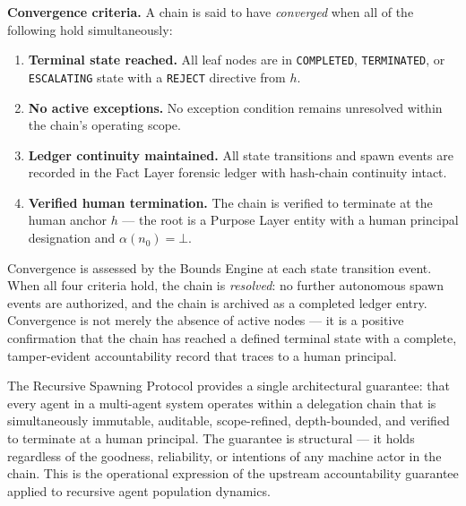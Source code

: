 \medskip
\noindent\textbf{Convergence criteria.} A chain is said to have \emph{converged} when all of the following hold simultaneously:

\begin{enumerate}
    \item[(C1)] \textbf{Terminal state reached.} All leaf nodes are in \texttt{COMPLETED}, \texttt{TERMINATED}, or \texttt{ESCALATING} state with a \texttt{REJECT} directive from $h$.
    \item[(C2)] \textbf{No active exceptions.} No exception condition remains unresolved within the chain's operating scope.
    \item[(C3)] \textbf{Ledger continuity maintained.} All state transitions and spawn events are recorded in the Fact Layer forensic ledger with hash-chain continuity intact.
    \item[(C4)] \textbf{Verified human termination.} The chain is verified to terminate at the human anchor $h$ — the root is a Purpose Layer entity with a human principal designation and $\alpha(n_0) = \bot$.
\end{enumerate}

Convergence is assessed by the Bounds Engine at each state transition event. When all four criteria hold, the chain is \emph{resolved}: no further autonomous spawn events are authorized, and the chain is archived as a completed ledger entry. Convergence is not merely the absence of active nodes — it is a positive confirmation that the chain has reached a defined terminal state with a complete, tamper-evident accountability record that traces to a human principal.

\medskip

The Recursive Spawning Protocol provides a single architectural guarantee: that every agent in a multi-agent system operates within a delegation chain that is simultaneously immutable, auditable, scope-refined, depth-bounded, and verified to terminate at a human principal. The guarantee is structural — it holds regardless of the goodness, reliability, or intentions of any machine actor in the chain. This is the operational expression of the upstream \bxthree{} accountability guarantee applied to recursive agent population dynamics.